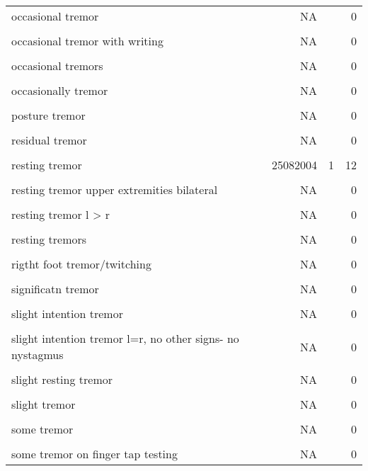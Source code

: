 \documentclass[10pt, letterpaper]{article}
\begin{document}
\begin{spacing}{1.0}
\begin{footnotesize}
\begin{longtable}[H]{p{4in}rrr}
        occasional tremor & NA &  & 0\\
        & & &\\[-6pt]
        occasional tremor with writing & NA &  & 0\\
        & & &\\[-6pt]
        occasional tremors & NA &  & 0\\
        & & &\\[-6pt]
        occasionally tremor & NA &  & 0\\
        & & &\\[-6pt]
        posture tremor & NA &  & 0\\
        & & &\\[-6pt]
        residual tremor & NA &  & 0\\
        & & &\\[-6pt]
        resting tremor & 25082004 & 1 & 12\\
        & & &\\[-6pt]
        resting tremor  upper extremities bilateral & NA &  & 0\\
        & & &\\[-6pt]
        resting tremor l > r & NA &  & 0\\
        & & &\\[-6pt]
        resting tremors & NA &  & 0\\
        & & &\\[-6pt]
        rigtht foot tremor/twitching & NA &  & 0\\
        & & &\\[-6pt]
        significatn tremor & NA &  & 0\\
        & & &\\[-6pt]
        slight intention tremor & NA &  & 0\\
        & & &\\[-6pt]
        slight intention tremor l=r, no other signs- no nystagmus & NA &  & 0\\
        & & &\\[-6pt]
        slight resting tremor & NA &  & 0\\
        & & &\\[-6pt]
        slight tremor & NA &  & 0\\
        & & &\\[-6pt]
        some tremor & NA &  & 0\\
        & & &\\[-6pt]
        some tremor on finger tap testing & NA &  & 0\\

\end{longtable}
\end{footnotesize}
\end{spacing}
\end{document}
